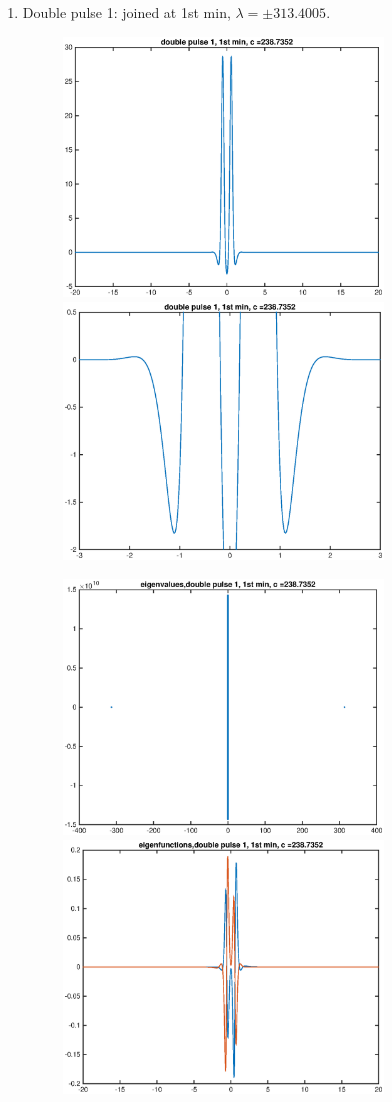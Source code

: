 \documentclass[12pt]{article}
\begin{document}
\begin{enumerate}
	\item Double pulse 1: joined at 1st min, $\lambda = \pm 313.4005$.
	\begin{figure}[H]
	\includegraphics[width=8.5cm]{1double1.eps}
	\includegraphics[width=8.5cm]{1double1zoom.eps}
	\end{figure}
	\begin{figure}[H]
	\includegraphics[width=8.5cm]{1double1eig.eps}
	\includegraphics[width=8.5cm]{1double1eigfn.eps}
	\end{figure}


\end{enumerate}
\end{document}
